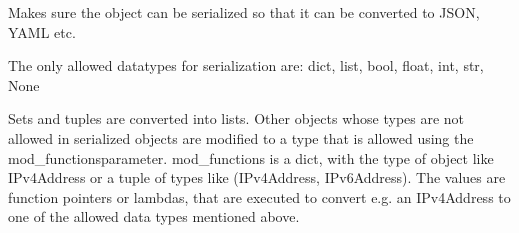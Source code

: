 \documentclass[a4paper,10pt,english]{sphinxmanual}
\begin{document}
\begin{fulllineitems}
\begin{fulllineitems}
\end{fulllineitems}


\begin{fulllineitems}
\label{\detokenize{fagus:fagus.Fagus.serialize}}
\pysigstartsignatures
{}
\pysigstopsignatures
\sphinxAtStartPar
Makes sure the object can be serialized so that it can be converted to JSON, YAML etc.

\sphinxAtStartPar
The only allowed data\sphinxhyphen{}types for serialization are: dict, list, bool, float, int, str, None

\sphinxAtStartPar
Sets and tuples are converted into lists. Other objects whose types are not allowed in serialized objects are
modified to a type that is allowed using the mod\_functions\sphinxhyphen{}parameter. mod\_functions is a dict, with the type
of object like IPv4Address or a tuple of types like (IPv4Address, IPv6Address). The values are function pointers
or lambdas, that are executed to convert e.g. an IPv4Address to one of the allowed data types mentioned above.


\end{fulllineitems}
\end{fulllineitems}
\end{document}
